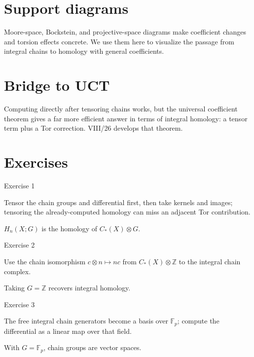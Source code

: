 \section{Support diagrams}
Moore-space, Bockstein, and projective-space diagrams make coefficient changes
and torsion effects concrete. We use them here to visualize the passage from
integral chains to homology with general coefficients.

\section{Bridge to UCT}
Computing directly after tensoring chains works, but the universal coefficient
theorem gives a far more efficient answer in terms of integral homology:
a tensor term plus a Tor correction.  VIII/26 develops that theorem.


\section{Exercises}

\begin{exercise}\label{exr:viii25-01}
Exercise 1
\end{exercise}
\begin{hint}
Tensor the chain groups and differential first, then take kernels and images; tensoring the already-computed homology can miss an adjacent Tor contribution.
\end{hint}
\begin{solution}
\(H_n(X;G)\) is the homology of \(C_*(X)\otimes G\).
\end{solution}

\begin{exercise}\label{exr:viii25-02}
Exercise 2
\end{exercise}
\begin{hint}
Use the chain isomorphism \(c\otimes n\mapsto nc\) from \(C_*(X)\otimes\mathbb Z\) to the integral chain complex.
\end{hint}
\begin{solution}
Taking \(G=\mathbb Z\) recovers integral homology.
\end{solution}

\begin{exercise}\label{exr:viii25-03}
Exercise 3
\end{exercise}
\begin{hint}
The free integral chain generators become a basis over \(\mathbb F_p\); compute the differential as a linear map over that field.
\end{hint}
\begin{solution}
With \(G=\mathbb F_p\), chain groups are vector spaces.
\end{solution}

